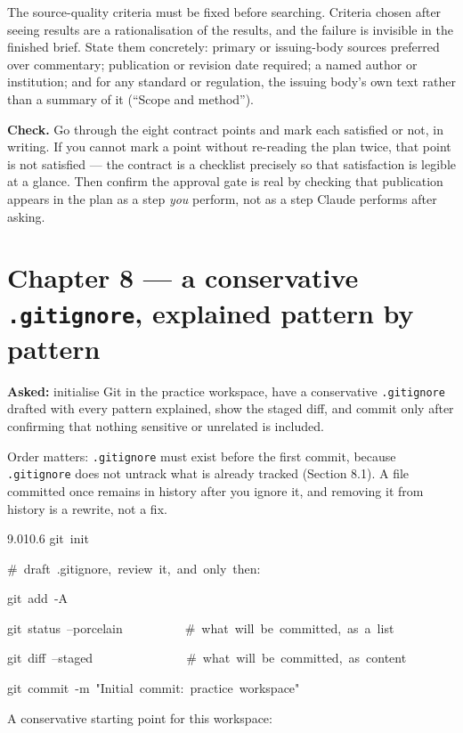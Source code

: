 \documentclass[11pt,a4paper,twoside,openany]{book}
\newcommand{\cl}[1]{\noindent\mbox{#1}\par}
\begin{document}
The source-quality criteria must be fixed before searching. Criteria chosen after seeing results are a rationalisation of the results, and the failure is invisible in the finished brief. State them concretely: primary or issuing-body sources preferred over commentary; publication or revision date required; a named author or institution; and for any standard or regulation, the issuing body's own text rather than a summary of it (“Scope and method”).


\textbf{Check.} Go through the eight contract points and mark each satisfied or not, in writing. If you cannot mark a point without re-reading the plan twice, that point is not satisfied — the contract is a checklist precisely so that satisfaction is legible at a glance. Then confirm the approval gate is real by checking that publication appears in the plan as a step \emph{you} perform, not as a step Claude performs after asking.


\FloatBarrier
\section*{Chapter 8 — a conservative \texttt{.\allowbreak{}gitignore}, explained pattern by pattern}

\textbf{Asked:} initialise Git in the practice workspace, have a conservative \texttt{.\allowbreak{}gitignore} drafted with every pattern explained, show the staged diff, and commit only after confirming that nothing sensitive or unrelated is included.


Order matters: \texttt{.\allowbreak{}gitignore} must exist before the first commit, because \texttt{.\allowbreak{}gitignore} does not untrack what is already tracked (Section 8.1). A file committed once remains in history after you ignore it, and removing it from history is a rewrite, not a fix.


\begin{codeblock}{9.0}{10.6}
\cl{git~init}
\cl{\#~draft~.gitignore,~review~it,~and~only~then:}
\cl{git~add~-A}
\cl{git~status~--porcelain~~~~~~~~~~\#~what~will~be~committed,~as~a~list}
\cl{git~diff~--staged~~~~~~~~~~~~~~~\#~what~will~be~committed,~as~content}
\cl{git~commit~-m~"Initial~commit:~practice~workspace"}
\end{codeblock}

A conservative starting point for this workspace:
\end{document}
